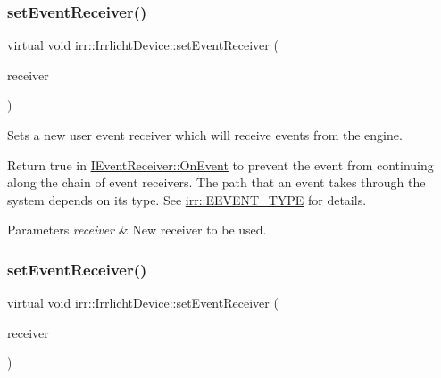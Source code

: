 \subsubsection{\texorpdfstring{set\+Event\+Receiver()}{setEventReceiver()}\hspace{0.1cm}{\footnotesize\ttfamily [1/3]}}
{\footnotesize\ttfamily virtual void irr\+::\+Irrlicht\+Device\+::set\+Event\+Receiver (\begin{DoxyParamCaption}\item[{\hyperlink{classirr_1_1IEventReceiver}{I\+Event\+Receiver} $\ast$}]{receiver }\end{DoxyParamCaption})\hspace{0.3cm}{\ttfamily [pure virtual]}}



Sets a new user event receiver which will receive events from the engine. 

Return true in \hyperlink{classirr_1_1IEventReceiver_a571f744ceffc3b4fe8a81f529163eb97}{I\+Event\+Receiver\+::\+On\+Event} to prevent the event from continuing along the chain of event receivers. The path that an event takes through the system depends on its type. See \hyperlink{namespaceirr_ac9eed96e06e85ce3c86fcbbbe9e48a0c}{irr\+::\+E\+E\+V\+E\+N\+T\+\_\+\+T\+Y\+PE} for details. 
\begin{DoxyParams}{Parameters}
{\em receiver} & New receiver to be used. \\
\hline
\end{DoxyParams}
\mbox{\label{classirr_1_1IrrlichtDevice_abf71a5ed6bb6b287e769f699010cedf0}} 
\subsubsection{\texorpdfstring{set\+Event\+Receiver()}{setEventReceiver()}\hspace{0.1cm}{\footnotesize\ttfamily [2/3]}}
{\footnotesize\ttfamily virtual void irr\+::\+Irrlicht\+Device\+::set\+Event\+Receiver (\begin{DoxyParamCaption}\item[{\hyperlink{classirr_1_1IEventReceiver}{I\+Event\+Receiver} $\ast$}]{receiver }\end{DoxyParamCaption})\hspace{0.3cm}{\ttfamily [pure virtual]}}



